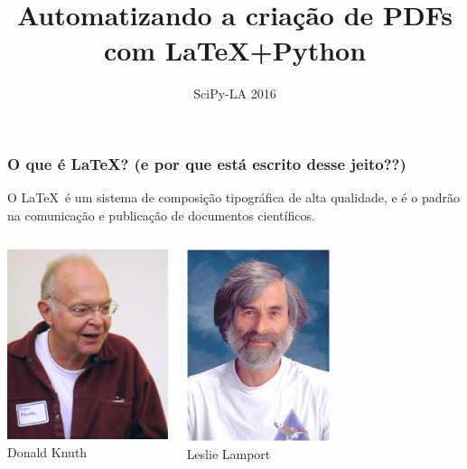 \documentclass{beamer}
\title{\textcolor{europeanalonis}{Automatizando a criação de PDFs com \LaTeX+Python}} \author[M. Weber Mendonça]
\institute[UFSC]{\inst{1} Universidade Federal de Santa Catarina}
\date{SciPy-LA 2016}
\begin{document}
\begin{frame}
 \titlepage
\end{frame}
\begin{frame}
   \frametitle{O que é \LaTeX? \small{(e por que está escrito desse jeito??)}}
   O \LaTeX\ é um sistema de composição tipográfica de alta qualidade, e é o padrão na comunicação e publicação de documentos científicos.
   \begin{columns}
      \column{5cm}
      \begin{center}
         \includegraphics[width=4.7cm]{img/knuth.jpg}\\
         Donald Knuth
      \end{center}
      \column{5cm}
      \begin{center}
         \includegraphics[width=4.2cm]{img/lamport.jpg}\\
         Leslie Lamport
      \end{center}
   \end{columns}
\end{frame}
\end{document}
